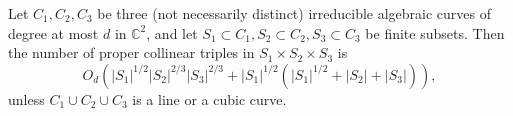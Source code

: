 \begin{theorem}\label{thm:rsz15:col}
Let $C_1, C_2, C_3$ be three (not necessarily distinct) irreducible algebraic curves
of degree at most $d$ in $\mathbb{C}^2$, and let $S_1 \subset C_1, S_2 \subset C_2, S_3
\subset C_3$ be finite subsets. Then the
number of proper collinear triples in $S_1 \times S_2 \times S_3$ is
\begin{displaymath}
	O_d( |S_1|^{1/2} |S_2|^{2/3} |S_3|^{2/3} + |S_1|^{1/2} (|S_1|^{1/2} + |S_2| +
|S_3| ) ),
\end{displaymath}
unless $C_1 \cup C_2 \cup C_3$ is a line or a cubic curve.
\end{theorem}
